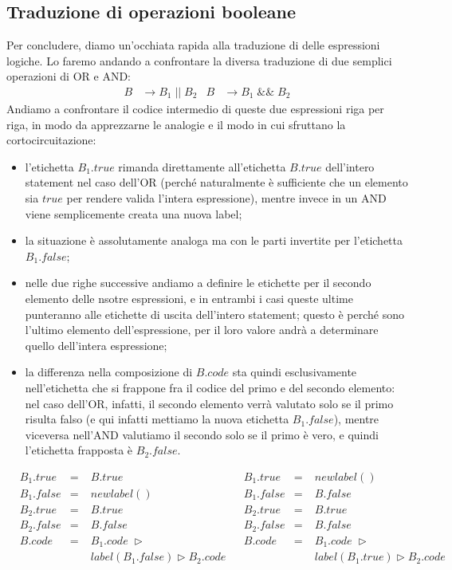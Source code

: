 \documentclass[class=book, crop=false, oneside, 12pt]{standalone}
\begin{document}
\subsection{Traduzione di operazioni booleane}
Per concludere, diamo un'occhiata rapida alla traduzione di delle espressioni logiche. Lo faremo andando a confrontare la diversa traduzione di due semplici operazioni di OR e AND:
\begin{align*}
    B &\to B_1\; ||\; B_2 & B &\to B_1\; \&\&\; B_2 
\end{align*}
Andiamo a confrontare il codice intermedio di queste due espressioni riga per riga, in modo da apprezzarne le analogie e il modo in cui sfruttano la cortocircuitazione:
\begin{itemize}
    \item l'etichetta \(B_1.true\) rimanda direttamente all'etichetta \(B.true\) dell'intero statement nel caso dell'OR (perché naturalmente è sufficiente che un elemento sia \(true\) per rendere valida l'intera espressione), mentre invece in un AND viene semplicemente creata una nuova label;
    \item la situazione è assolutamente analoga ma con le parti invertite per l'etichetta \(B_1.false\);
    \item nelle due righe successive andiamo a definire le etichette per il secondo elemento delle nsotre espressioni, e in entrambi i casi queste ultime punteranno alle etichette di uscita dell'intero statement; questo è perché sono l'ultimo elemento dell'espressione, per il loro valore andrà a determinare quello dell'intera espressione;
    \item la differenza nella composizione di \(B.code\) sta quindi esclusivamente nell'etichetta che si frappone fra il codice del primo e del secondo elemento: nel caso dell'OR, infatti, il secondo elemento verrà valutato solo se il primo risulta falso (e qui infatti mettiamo la nuova etichetta \(B_1.false\)), mentre viceversa nell'AND valutiamo il secondo solo se il primo è vero, e quindi l'etichetta frapposta è \(B_2.false\).
\end{itemize}
\begin{align*}
    &B_1.true &=\; &B.true & &B_1.true &=\; &newlabel() \\
    &B_1.false &=\; &newlabel() & &B_1.false &=\; &B.false \\
    &B_2.true &=\; &B.true & &B_2.true &=\; &B.true \\
    &B_2.false &=\; &B.false & &B_2.false &=\; &B.false \\
    &B.code &=\; &B_1.code\; \triangleright & &B.code &=\; &B_1.code\; \triangleright \\
    &&&label(B_1.false) \triangleright  B_2.code & &&&  label(B_1.true) \triangleright B_2.code
\end{align*}
\end{document}
